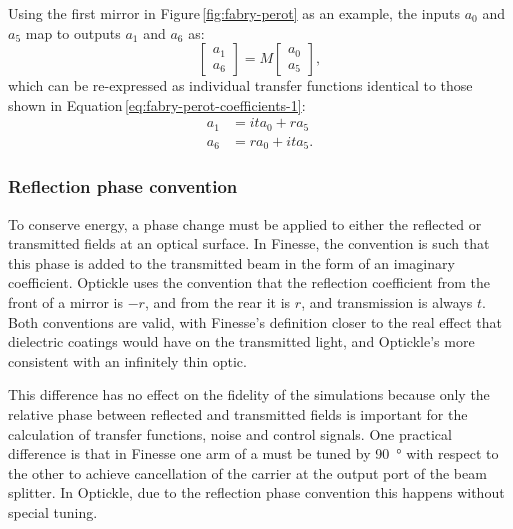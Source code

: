 Using the first mirror in Figure\,\ref{fig:fabry-perot} as an example, the inputs $a_0$ and $a_5$ map to outputs $a_1$ and $a_6$ as:
\begin{equation}
  \begin{bmatrix}
    a_1 \\
    a_6
  \end{bmatrix}
  =
  M
  \begin{bmatrix}
    a_0 \\
    a_5
  \end{bmatrix}
  ,
\end{equation}
which can be re-expressed as individual transfer functions identical to those shown in Equation\,\ref{eq:fabry-perot-coefficients-1}:
\begin{equation}
  \begin{split}
    a_1 &= it a_0 + r a_5 \\
    a_6 &= r a_0 + it a_5.
  \end{split}
\end{equation}

\subsubsection{\label{a:reflection-phase}Reflection phase convention}
To conserve energy, a phase change must be applied to either the reflected or transmitted fields at an optical surface. In Finesse, the convention is such that this phase is added to the transmitted beam in the form of an imaginary coefficient. Optickle uses the convention that the reflection coefficient from the front of a mirror is $-r$, and from the rear it is $r$, and transmission is always $t$. Both conventions are valid, with Finesse's definition closer to the real effect that dielectric coatings would have on the transmitted light, and Optickle's more consistent with an infinitely thin optic.

This difference has no effect on the fidelity of the simulations because only the relative phase between reflected and transmitted fields is important for the calculation of transfer functions, noise and control signals. One practical difference is that in Finesse one arm of a \MI{} must be tuned by \SI{90}{\degree} with respect to the other to achieve cancellation of the carrier at the output port of the beam splitter. In Optickle, due to the reflection phase convention this happens without special tuning.

